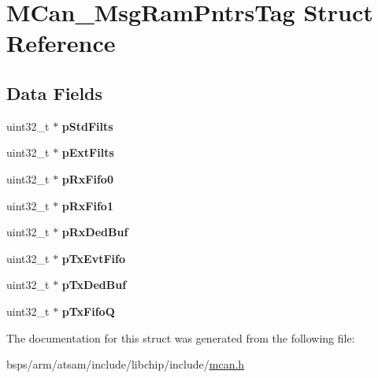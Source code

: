 \hypertarget{structMCan__MsgRamPntrsTag}{}\section{M\+Can\+\_\+\+Msg\+Ram\+Pntrs\+Tag Struct Reference}
\label{structMCan__MsgRamPntrsTag}
\subsection*{Data Fields}
\begin{DoxyCompactItemize}
\item 
\mbox{\label{structMCan__MsgRamPntrsTag_af00134ef8726b36d5c8824be0b96112e}} 
uint32\+\_\+t $\ast$ {\bfseries p\+Std\+Filts}
\item 
\mbox{\label{structMCan__MsgRamPntrsTag_a3467076bd5ded0c85248dd76711dd6fb}} 
uint32\+\_\+t $\ast$ {\bfseries p\+Ext\+Filts}
\item 
\mbox{\label{structMCan__MsgRamPntrsTag_a545813aa999a58d89d4c6b2d0bfbdfcd}} 
uint32\+\_\+t $\ast$ {\bfseries p\+Rx\+Fifo0}
\item 
\mbox{\label{structMCan__MsgRamPntrsTag_a30915e714bff0f6b0ac1be7722abef93}} 
uint32\+\_\+t $\ast$ {\bfseries p\+Rx\+Fifo1}
\item 
\mbox{\label{structMCan__MsgRamPntrsTag_a3422dc355f732141ab3e971b8bb38f2c}} 
uint32\+\_\+t $\ast$ {\bfseries p\+Rx\+Ded\+Buf}
\item 
\mbox{\label{structMCan__MsgRamPntrsTag_af7a4d2fdc062fe254faa4400517a0422}} 
uint32\+\_\+t $\ast$ {\bfseries p\+Tx\+Evt\+Fifo}
\item 
\mbox{\label{structMCan__MsgRamPntrsTag_a46562356d8a79a78c259e90631f6994b}} 
uint32\+\_\+t $\ast$ {\bfseries p\+Tx\+Ded\+Buf}
\item 
\mbox{\label{structMCan__MsgRamPntrsTag_ac701db646e005b966150943fc2b99743}} 
uint32\+\_\+t $\ast$ {\bfseries p\+Tx\+FifoQ}
\end{DoxyCompactItemize}


The documentation for this struct was generated from the following file\+:\begin{DoxyCompactItemize}
\item 
bsps/arm/atsam/include/libchip/include/\mbox{\hyperlink{mcan_8h}{mcan.\+h}}\end{DoxyCompactItemize}
